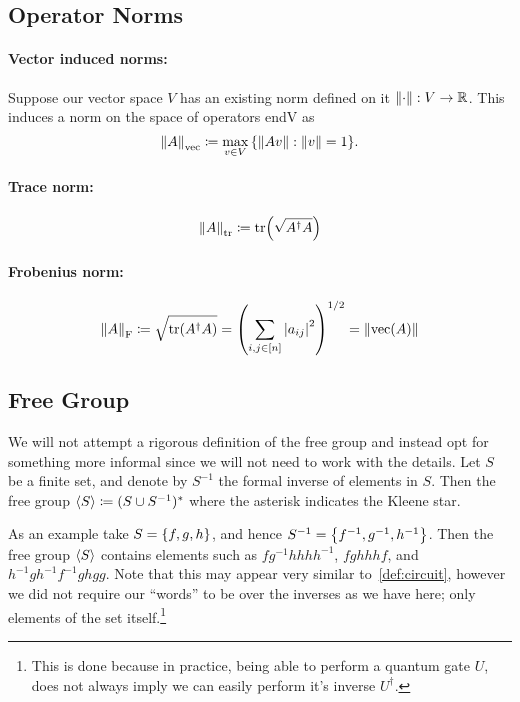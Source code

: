 \subsection{Operator Norms}

\paragraph{Vector induced norms:}
Suppose our vector space $V$ has an existing norm defined on it $\norm{\cdot}: V \to \mathbb{R}$.
This induces a norm on the space of operators \gls{endV} as
\begin{equation}
    \norm{A}_\text{vec} \coloneqq \max_{v \in V}\qty{\norm{A v}: \norm{v} = 1}.
\end{equation}

\paragraph{Trace norm:}
\begin{equation}
    \norm{A}_\text{tr} \coloneqq \tr(\sqrt{A^\dagger A})
\end{equation}

\paragraph{Frobenius norm:}
\begin{equation}
    \norm{A}_\text{F} \coloneqq \sqrt{\tr(A^\dagger A)} = \qty(\sum_{i, j \in [n]}\abs{a_{ij}}^2)^{1/2} = \norm{\operatorname{vec}(A)}
\end{equation}


\subsection{Free Group}
We will not attempt a rigorous definition of the free group and instead opt for something more informal since we will not need to work with the details.
Let $S$ be a finite set, and denote by $S^{-1}$ the formal inverse of elements in $S$.
Then the free group $\expval{S} \coloneqq (S\cup S^{-1})^*$ where the asterisk indicates the Kleene star.

As an example take $S = \qty{f, g, h}$, and hence $S^{-1} = \qty{f^{-1}, g^{-1}, h^{-1}}$.
Then the free group $\expval{S}$ contains elements such as $fg^{-1}hhhh^{-1}$, $fghhhf$, and $h^{-1}gh^{-1}f^{-1}ghgg$.
Note that this may appear very similar to~\cref{def:circuit}, however we did not require our ``words'' to be over the inverses as we have here; only elements of the set itself.\footnote{This is done because in practice, being able to perform a quantum gate $U$, does not always imply we can easily perform it's inverse $U^\dagger$.} %

